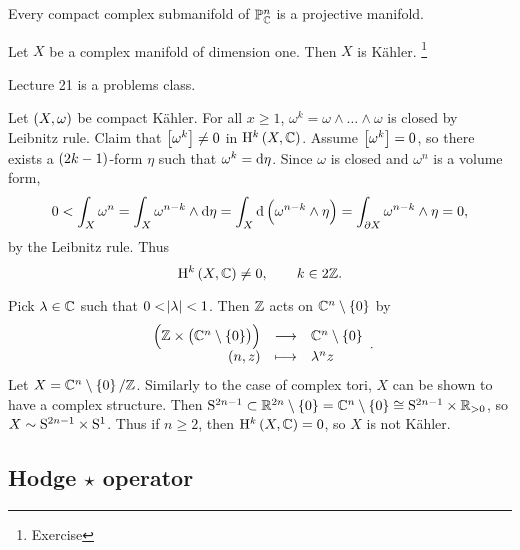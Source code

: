 \begin{fact*}
Every compact complex submanifold of $ \PP_\CC^n $ is a projective manifold.
\end{fact*}

\begin{example*}
Let $ X $ be a complex manifold of dimension one. Then $ X $ is K\"ahler. \footnote{Exercise}
\end{example*}


Lecture 21 is a problems class.

\pagebreak


Let $ \br{X, \omega} $ be compact K\"ahler. For all $ x \ge 1 $, $ \omega^k = \omega \wedge \dots \wedge \omega $ is closed by Leibnitz rule. Claim that $ \sbr{\omega^k} \ne 0 $ in $ \H^k\br{X, \CC} $. Assume $ \sbr{\omega^k} = 0 $, so there exists a $ \br{2k - 1} $-form $ \eta $ such that $ \omega^k = \d\eta $. Since $ \omega $ is closed and $ \omega^n $ is a volume form,
$$ 0 < \int_X \omega^n = \int_X \omega^{n - k} \wedge \d\eta = \int_X \d\br{\omega^{n - k} \wedge \eta} = \int_{\partial X} \omega^{n - k} \wedge \eta = 0, $$
by the Leibnitz rule. Thus
$$ \H^k\br{X, \CC} \ne 0, \qquad k \in 2\ZZ. $$

\begin{example}
Pick $ \lambda \in \CC $ such that $ 0 < \abs{\lambda} < 1 $. Then $ \ZZ $ acts on $ \CC^n \setminus \cbr{0} $ by
$$ \function{\br{\ZZ \times \br{\CC^n \setminus \cbr{0}}}}{\CC^n \setminus \cbr{0}}{\br{n, z}}{\lambda^nz}. $$
Let $ X = \CC^n \setminus \cbr{0} / \ZZ $. Similarly to the case of complex tori, $ X $ can be shown to have a complex structure. Then $ \S^{2n - 1} \subset \RR^{2n} \setminus \cbr{0} = \CC^n \setminus \cbr{0} \cong \S^{2n - 1} \times \RR_{> 0} $, so $ X \sim \S^{2n - 1} \times \S^1 $. Thus if $ n \ge 2 $, then $ \H^k\br{X, \CC} = 0 $, so $ X $ is not K\"ahler.
\end{example}

\subsection{Hodge \texorpdfstring{$ \star $}{*} operator}

